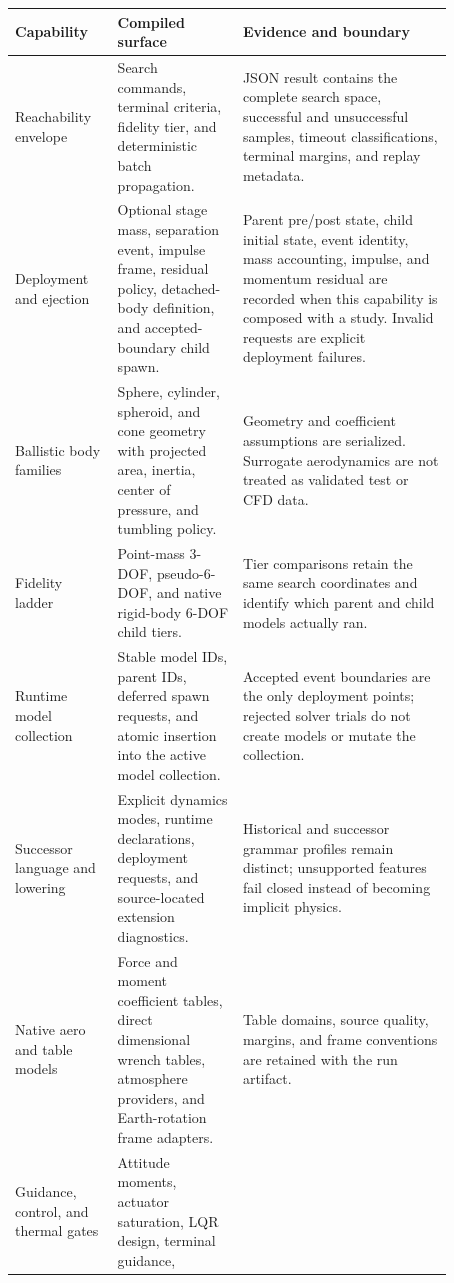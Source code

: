 \begin{longtable}{p{0.20\linewidth}p{0.25\linewidth}p{0.42\linewidth}}
\toprule
\textbf{Capability} & \textbf{Compiled surface} & \textbf{Evidence and boundary}\\
\midrule
\endhead
Reachability envelope &
  Search commands, terminal criteria, fidelity tier, and deterministic batch
  propagation. &
  JSON result contains the complete search space, successful and unsuccessful
  samples, timeout classifications, terminal margins, and replay metadata.\\
Deployment and ejection &
  Optional stage mass, separation event, impulse frame, residual policy,
  detached-body definition, and accepted-boundary child spawn. &
  Parent pre/post state, child initial state, event identity, mass accounting,
  impulse, and momentum residual are recorded when this capability is
  composed with a study. Invalid requests are explicit deployment failures.\\
Ballistic body families &
  Sphere, cylinder, spheroid, and cone geometry with projected area, inertia,
  center of pressure, and tumbling policy. &
  Geometry and coefficient assumptions are serialized. Surrogate aerodynamics
  are not treated as validated test or CFD data.\\
Fidelity ladder &
  Point-mass 3-DOF, pseudo-6-DOF, and native rigid-body 6-DOF child tiers. &
  Tier comparisons retain the same search coordinates and identify which
  parent and child models actually ran.\\
Runtime model collection &
  Stable model IDs, parent IDs, deferred spawn requests, and atomic insertion
  into the active model collection. &
  Accepted event boundaries are the only deployment points; rejected solver
  trials do not create models or mutate the collection.\\
Successor language and lowering &
  Explicit dynamics modes, runtime declarations, deployment requests, and
  source-located extension diagnostics. &
  Historical and successor grammar profiles remain distinct; unsupported
  features fail closed instead of becoming implicit physics.\\
Native aero and table models &
  Force and moment coefficient tables, direct dimensional wrench tables,
  atmosphere providers, and Earth-rotation frame adapters. &
  Table domains, source quality, margins, and frame conventions are retained
  with the run artifact.\\
Guidance, control, and thermal gates &
  Attitude moments, actuator saturation, LQR design, terminal guidance,

\end{longtable}
